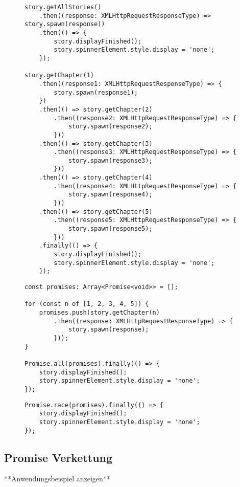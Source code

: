 \begin{figure}[H]
\begin{lstlisting}
story.getAllStories()
    .then((response: XMLHttpRequestResponseType) => story.spawn(response))
    .then(() => {
        story.displayFinished();
        story.spinnerElement.style.display = 'none';
    });

story.getChapter(1)
    .then((response1: XMLHttpRequestResponseType) => {
        story.spawn(response1);
    })
    .then(() => story.getChapter(2)
        .then((response2: XMLHttpRequestResponseType) => {
            story.spawn(response2);
        }))
    .then(() => story.getChapter(3)
        .then((response3: XMLHttpRequestResponseType) => {
            story.spawn(response3);
        }))
    .then(() => story.getChapter(4)
        .then((response4: XMLHttpRequestResponseType) => {
            story.spawn(response4);
        }))
    .then(() => story.getChapter(5)
        .then((response5: XMLHttpRequestResponseType) => {
            story.spawn(response5);
        }))
    .finally(() => {
        story.displayFinished();
        story.spinnerElement.style.display = 'none';
    });
\end{lstlisting}
\end{figure}

\begin{figure}[H]
\begin{lstlisting}
const promises: Array<Promise<void>> = [];

for (const n of [1, 2, 3, 4, 5]) {
    promises.push(story.getChapter(n)
        .then((response: XMLHttpRequestResponseType) => {
            story.spawn(response);
        }));
}

Promise.all(promises).finally(() => {
    story.displayFinished();
    story.spinnerElement.style.display = 'none';
});
\end{lstlisting}
\end{figure}

\begin{figure}[H]
\begin{lstlisting}
Promise.race(promises).finally(() => {
    story.displayFinished();
    story.spinnerElement.style.display = 'none';
});
\end{lstlisting}
\end{figure}



\subsection{Promise Verkettung}
**Anwendungsbeispiel anzeigen**

